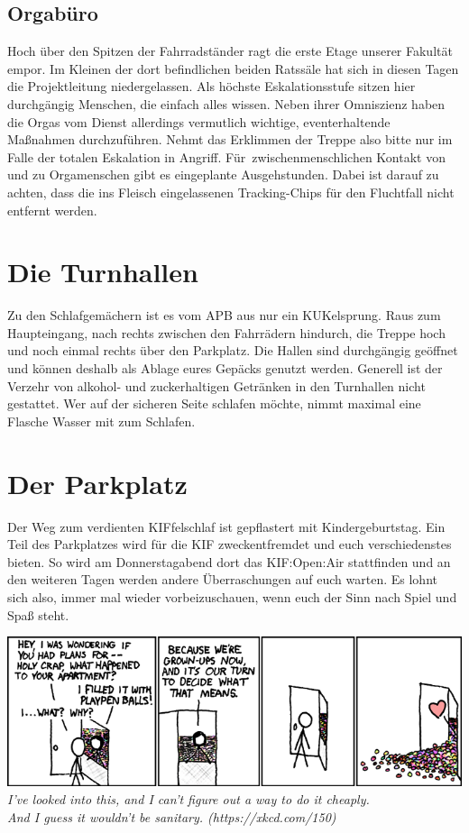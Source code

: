 \subsection*{Orgabüro}
Hoch über den Spitzen der Fahrradständer ragt die erste Etage unserer Fakultät empor.
Im Kleinen der dort befindlichen beiden Ratssäle hat sich in diesen Tagen die Projektleitung niedergelassen.
Als höchste Eskalationsstufe sitzen hier durchgängig Menschen, die einfach alles wissen.
Neben ihrer Omniszienz haben die Orgas vom Dienst allerdings vermutlich wichtige, eventerhaltende Maßnahmen durchzuführen.
Nehmt das Erklimmen der Treppe also bitte nur im Falle der totalen Eskalation in Angriff.
Für~zwischenmenschlichen Kontakt von und zu Orgamenschen gibt es eingeplante Ausgehstunden.
Dabei ist darauf zu achten, dass die ins Fleisch eingelassenen Tracking-Chips für den Fluchtfall nicht entfernt werden.

\section*{Die Turnhallen}
Zu den Schlafgemächern ist es vom APB aus nur ein KUKelsprung.
Raus zum Haupteingang, nach rechts zwischen den Fahrrädern hindurch, die Treppe hoch und noch einmal rechts über den Parkplatz.
Die Hallen sind durchgängig geöffnet und können deshalb als Ablage eures Gepäcks genutzt werden.
Generell ist der Verzehr von alkohol- und zuckerhaltigen Getränken in den Turnhallen nicht gestattet.
Wer auf der sicheren Seite schlafen möchte, nimmt maximal eine Flasche Wasser mit zum Schlafen.

\section*{Der Parkplatz}
Der Weg zum verdienten KIFfelschlaf ist gepflastert mit Kindergeburtstag.
Ein Teil des Parkplatzes wird für die KIF zweckentfremdet und euch verschiedenstes bieten.
So wird am Donnerstagabend dort das KIF:Open:Air stattfinden und an den weiteren Tagen werden andere Überraschungen auf euch warten.
Es lohnt sich also, immer mal wieder vorbeizuschauen, wenn euch der Sinn nach Spiel und Spaß steht.

\vfill

\begin{center}
\includegraphics[width=.8\textwidth,keepaspectratio]{img/xkcd/grownups.png}\\
{\footnotesize \textit{I've looked into this, and I can't figure out a way to do it cheaply.\\And I guess it wouldn't be sanitary. (https://xkcd.com/150)}}
\end{center}

